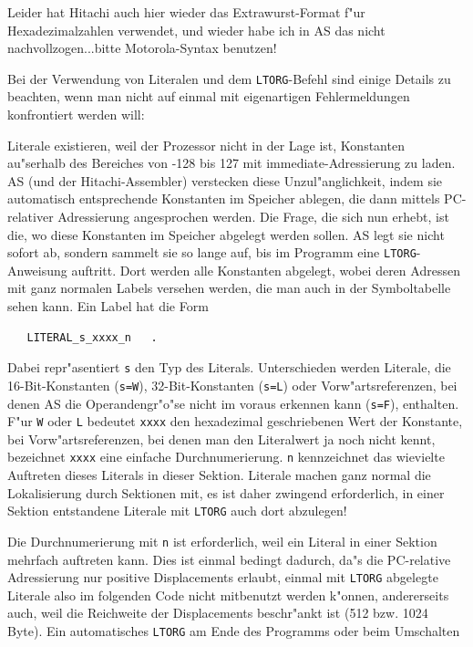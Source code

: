\documentclass[12pt,a4paper,twoside]{report}
\newcommand{\tty}[1]{{\tt #1}}
\newcommand{\asname}{AS}
\begin{document}
Leider hat Hitachi auch hier wieder das Extrawurst-Format f"ur
Hexadezimalzahlen verwendet, und wieder habe ich in \asname{} das nicht
nachvollzogen...bitte Motorola-Syntax benutzen!
\par
Bei der Verwendung von Literalen und dem \tty{LTORG}-Befehl sind
einige Details zu beachten, wenn man nicht auf einmal mit eigenartigen
Fehlermeldungen konfrontiert werden will:
\par
Literale existieren, weil der Prozessor nicht in der Lage ist, Konstanten
au"serhalb des Bereiches von -128 bis 127 mit immediate-Adressierung
zu laden.  \asname{} (und der Hitachi-Assembler) verstecken diese Unzul"anglichkeit,
indem sie automatisch entsprechende Konstanten im Speicher ablegen, die
dann mittels PC-relativer Adressierung angesprochen werden.  Die Frage, die
sich nun erhebt, ist die, wo diese Konstanten im Speicher abgelegt werden
sollen.  \asname{} legt sie nicht sofort ab, sondern sammelt sie so lange
auf, bis im Programm eine \tty{LTORG}-Anweisung auftritt.  Dort werden
alle Konstanten abgelegt, wobei deren Adressen mit ganz normalen
Labels versehen werden, die man auch in der Symboltabelle sehen kann.
Ein Label hat die Form
\begin{verbatim}
   LITERAL_s_xxxx_n   .
\end{verbatim}
Dabei repr"asentiert \tty{s} den Typ des Literals.  Unterschieden werden
Literale, die 16-Bit-Konstanten (\tty{s=W}), 32-Bit-Konstanten (\tty{s=L})
oder Vorw"artsreferenzen, bei denen \asname{} die Operandengr"o"se nicht
im voraus erkennen kann (\tty{s=F}), enthalten.  F"ur \tty{W} oder \tty{L}
bedeutet \tty{xxxx} den hexadezimal geschriebenen Wert der Konstante, bei
Vorw"artsreferenzen, bei denen man den Literalwert ja noch nicht kennt,
bezeichnet \tty{xxxx} eine einfache Durchnumerierung. \tty{n} kennzeichnet
das wievielte Auftreten dieses Literals in dieser Sektion.  Literale machen
ganz normal die Lokalisierung durch Sektionen mit, es ist daher zwingend
erforderlich, in einer Sektion entstandene Literale mit \tty{LTORG} auch
dort abzulegen!
\par
Die Durchnumerierung mit \tty{n} ist erforderlich, weil ein Literal in
einer Sektion mehrfach auftreten kann.  Dies ist einmal bedingt dadurch,
da"s die PC-relative Adressierung nur positive Displacements erlaubt,
einmal mit \tty{LTORG} abgelegte Literale also im folgenden Code nicht
mitbenutzt werden k"onnen, andererseits auch, weil die Reichweite der
Displacements beschr"ankt ist (512 bzw. 1024 Byte).
Ein automatisches \tty{LTORG} am Ende des Programms oder beim Umschalten
\end{document}
